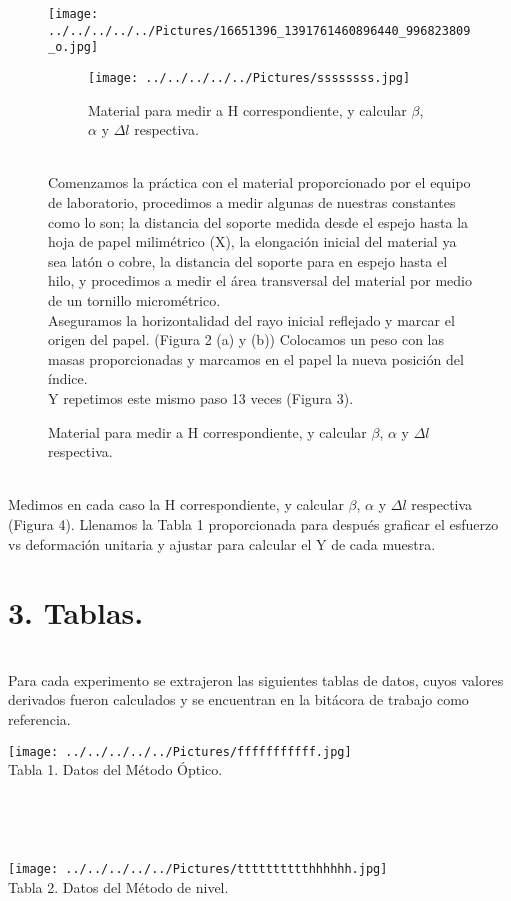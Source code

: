 \documentclass[10pt,a4paper]{article}
\begin{document}
\begin{figure}[hbtp]
\centering
\texttt{[image: ../../../../../Pictures/16651396\_1391761460896440\_996823809\_o.jpg]}
\caption{Agrupamiento de pesas en el arreglo. }

\begin{figure}[hbtp]
\centering
\texttt{[image: ../../../../../Pictures/ssssssss.jpg]}
\caption{Material para medir a H correspondiente, y calcular $\beta$, $\alpha$ y $\Delta l$ respectiva.}
\end{figure}
\\

\pagebreak 
Comenzamos la pr\'{a}ctica con el material proporcionado por el equipo de laboratorio, procedimos a medir algunas de nuestras constantes como lo son; la distancia del soporte medida desde el espejo hasta la hoja de papel milim\'{e}trico (X), la elongaci\'{o}n inicial del material ya sea lat\'{o}n o cobre, la distancia del soporte para en espejo hasta el hilo, y procedimos a medir el \'{a}rea transversal del material por medio de un tornillo microm\'{e}trico. \\
Aseguramos la horizontalidad del rayo inicial reflejado y marcar el origen del papel. (Figura 2 (a) y (b))
Colocamos un peso con las masas proporcionadas y marcamos en el papel la nueva posici\'{o}n del \'{i}ndice.\\
Y repetimos este mismo paso 13 veces (Figura 3).
\end{figure}\\
Medimos en cada caso la H correspondiente, y calcular $\beta$, $\alpha$ y $\Delta l$ respectiva (Figura 4). Llenamos la Tabla 1 proporcionada para despu\'{e}s graficar el esfuerzo vs deformaci\'{o}n unitaria y ajustar para calcular el Y de cada muestra.

\section*{3. Tablas.}
\\
Para cada experimento se extrajeron las siguientes tablas de datos, cuyos valores derivados fueron calculados y se encuentran en la bit\'{a}cora de trabajo como referencia.
\\
\begin{figure 2}
\centering
\texttt{[image: ../../../../../Pictures/fffffffffff.jpg]} 
\\
\caption{Tabla 1. Datos del M\'{e}todo \'{O}ptico.}
\\
\centering
\end{figure 2}
\\
\begin{figure 3}
\centering
\texttt{[image: ../../../../../Pictures/tttttttttthhhhhh.jpg]} 
\\
\caption{Tabla 2. Datos del M\'{e}todo de nivel.}\\
\\
\\
\end{figure 3}
\end{document}
